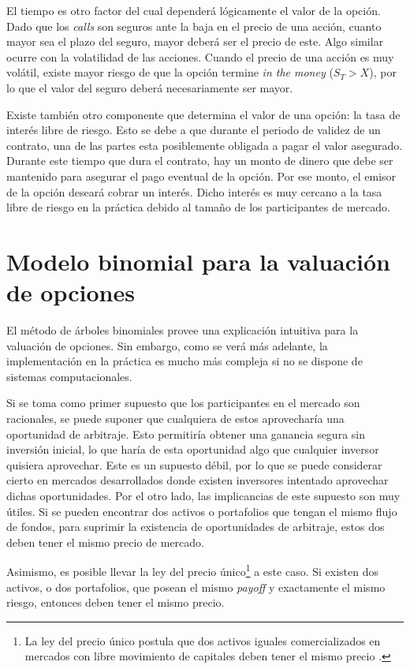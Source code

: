 El tiempo es otro factor del cual dependerá lógicamente el valor de la opción. Dado que los \textit{calls} son seguros ante la baja en el precio de una acción, cuanto mayor sea el plazo del seguro, mayor deberá ser el precio de este. Algo similar ocurre con la volatilidad de las acciones. Cuando el precio de una acción es muy volátil, existe mayor riesgo de que la opción termine \textit{in the money} ($ S_T > X $), por lo que el valor del seguro deberá necesariamente ser mayor.

Existe también otro componente que determina el valor de una opción: la tasa de interés libre de riesgo. Esto se debe a que durante el periodo de validez de un contrato, una de las partes esta posiblemente obligada a pagar el valor asegurado. Durante este tiempo que dura el contrato, hay un monto de dinero que debe ser mantenido para asegurar el pago eventual de la opción. Por ese monto, el emisor de la opción deseará cobrar un interés. Dicho interés es muy cercano a la tasa libre de riesgo en la práctica debido al tamaño de los participantes de mercado. 



\section{Modelo binomial para la valuación de opciones}

El método de árboles binomiales provee una explicación intuitiva para la valuación de opciones. Sin embargo, como se verá más adelante, la implementación en la práctica es mucho más compleja si no se dispone de sistemas computacionales. 

Si se toma como primer supuesto que los participantes en el mercado son racionales, se puede suponer que cualquiera de estos aprovecharía una oportunidad de arbitraje. Esto permitiría obtener una ganancia segura sin inversión inicial, lo que haría de esta oportunidad algo que cualquier inversor quisiera aprovechar. Este es un supuesto débil, por lo que se puede considerar cierto en mercados desarrollados donde existen inversores intentado aprovechar dichas oportunidades. Por el otro lado, las implicancias de este supuesto son muy útiles. Si se pueden encontrar dos activos o portafolios que tengan el mismo flujo de fondos, para suprimir la existencia de oportunidades de arbitraje, estos dos deben tener el mismo precio de mercado.

Asimismo, es posible llevar la ley del precio único\footnote{La ley del precio único postula que dos activos iguales comercializados en mercados con libre movimiento de capitales deben tener el mismo precio \cite{lawofoneprice}.} a este caso. Si existen dos activos, o dos portafolios, que posean el mismo \textit{payoff} y exactamente el mismo riesgo, entonces deben tener el mismo precio.

